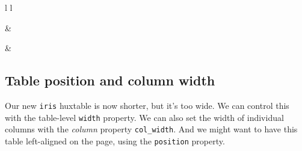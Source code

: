 \documentclass[
]{article}
\begin{document}
\begin{table}[ht]
\begin{centerbox}
\begin{threeparttable}
\begin{tabular}{l l}

 &
 \tabularnewline[-0.5pt]



 &
 \tabularnewline[-0.5pt]


\end{tabular}
\end{threeparttable}\par\end{centerbox}

\end{table}
 

\FloatBarrier

\hypertarget{table-position-and-column-width}{%
\subsection{Table position and column
width}\label{table-position-and-column-width}}

Our new \texttt{iris} huxtable is now shorter, but it's too wide. We can
control this with the table-level \texttt{width} property. We can also
set the width of individual columns with the \emph{column} property
\texttt{col\_width}. And we might want to have this table left-aligned
on the page, using the \texttt{position} property.
\end{document}
